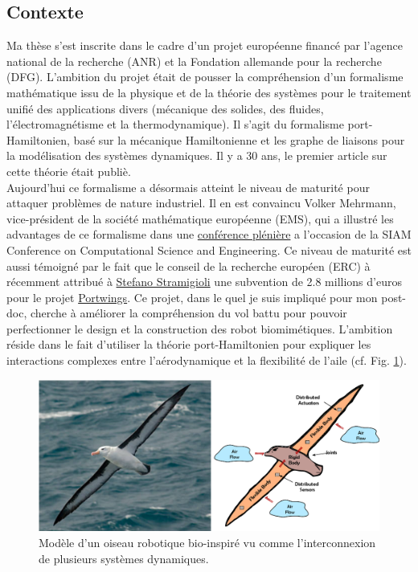 \documentclass[french]{article}
\begin{document}
\subsection{Contexte}

Ma thèse s'est inscrite dans le cadre d'un projet européenne financé par l'agence national de la recherche (ANR) et la Fondation allemande pour la recherche (DFG). L'ambition du projet était de pousser la compréhension d'un formalisme mathématique issu de la physique et de la théorie des systèmes pour le traitement unifié des applications divers (mécanique des solides, des fluides, l'électromagnétisme et la thermodynamique). Il s'agit du formalisme port-Hamiltonien, bas\'e sur la mécanique Hamiltonienne et les graphe de liaisons pour la modélisation des systèmes dynamiques. Il y a 30 ans, le premier article sur cette théorie était publi\`e.  \\

Aujourd'hui ce formalisme a désormais atteint le niveau de maturit\'e pour attaquer problèmes de nature industriel. Il en est convaincu Volker Mehrmann, vice-président de la société mathématique européenne (EMS), qui a illustré les advantages de ce formalisme dans une \href{https://meetings.siam.org/sess/dsp_programsess.cfm?SESSIONCODE=70329}{conférence plénière} a l'occasion de la SIAM Conference on Computational Science and Engineering. Ce niveau de maturit\'e est aussi témoigné par le fait que le conseil de la recherche européen (ERC) \`a récemment attribu\'e \`a \href{https://people.utwente.nl/s.stramigioli?tab=about-me}{Stefano Stramigioli} une subvention de 2.8 millions d'euros pour le projet \href{http://www.portwings.eu/}{Portwings}. Ce projet, dans le quel je suis impliqu\'e pour mon post-doc, cherche \`a améliorer la compréhension du vol battu pour pouvoir perfectionner le design et la construction des robot biomimétiques. L'ambition réside dans le fait d'utiliser la théorie port-Hamiltonien pour expliquer les interactions complexes entre l'aérodynamique et la flexibilit\'e de l'aile (cf. Fig. \ref{fig:pH_view_bird}).

\begin{figure}[tb]
	\centering
	\includegraphics[width = \textwidth]{Bird_Port_Hamiltonian_Subsystems_FULL_ARC.eps}
	\caption{Modèle d'un oiseau robotique bio-inspiré vu comme l'interconnexion de plusieurs systèmes dynamiques. }
	\label{fig:pH_view_bird}
\end{figure}
\end{document}
